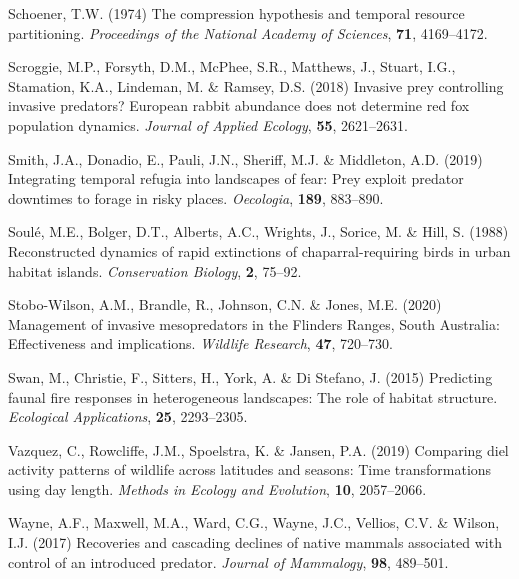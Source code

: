 \documentclass[]{elsarticle} %
\begin{document}
\leavevmode\hypertarget{ref-schoener1974compression}{}%
Schoener, T.W. (1974) The compression hypothesis and temporal resource partitioning. \emph{Proceedings of the National Academy of Sciences}, \textbf{71}, 4169--4172.

\leavevmode\hypertarget{ref-scroggie2018invasive}{}%
Scroggie, M.P., Forsyth, D.M., McPhee, S.R., Matthews, J., Stuart, I.G., Stamation, K.A., Lindeman, M. \& Ramsey, D.S. (2018) Invasive prey controlling invasive predators? European rabbit abundance does not determine red fox population dynamics. \emph{Journal of Applied Ecology}, \textbf{55}, 2621--2631.

\leavevmode\hypertarget{ref-smith2019integrating}{}%
Smith, J.A., Donadio, E., Pauli, J.N., Sheriff, M.J. \& Middleton, A.D. (2019) Integrating temporal refugia into landscapes of fear: Prey exploit predator downtimes to forage in risky places. \emph{Oecologia}, \textbf{189}, 883--890.

\leavevmode\hypertarget{ref-soule1988reconstructed}{}%
Soulé, M.E., Bolger, D.T., Alberts, A.C., Wrights, J., Sorice, M. \& Hill, S. (1988) Reconstructed dynamics of rapid extinctions of chaparral-requiring birds in urban habitat islands. \emph{Conservation Biology}, \textbf{2}, 75--92.

\leavevmode\hypertarget{ref-stobo2020management}{}%
Stobo-Wilson, A.M., Brandle, R., Johnson, C.N. \& Jones, M.E. (2020) Management of invasive mesopredators in the Flinders Ranges, South Australia: Effectiveness and implications. \emph{Wildlife Research}, \textbf{47}, 720--730.

\leavevmode\hypertarget{ref-swan2015predicting}{}%
Swan, M., Christie, F., Sitters, H., York, A. \& Di Stefano, J. (2015) Predicting faunal fire responses in heterogeneous landscapes: The role of habitat structure. \emph{Ecological Applications}, \textbf{25}, 2293--2305.

\leavevmode\hypertarget{ref-vazquez2019comparing}{}%
Vazquez, C., Rowcliffe, J.M., Spoelstra, K. \& Jansen, P.A. (2019) Comparing diel activity patterns of wildlife across latitudes and seasons: Time transformations using day length. \emph{Methods in Ecology and Evolution}, \textbf{10}, 2057--2066.

\leavevmode\hypertarget{ref-wayne2017recoveries}{}%
Wayne, A.F., Maxwell, M.A., Ward, C.G., Wayne, J.C., Vellios, C.V. \& Wilson, I.J. (2017) Recoveries and cascading declines of native mammals associated with control of an introduced predator. \emph{Journal of Mammalogy}, \textbf{98}, 489--501.
\end{document}
